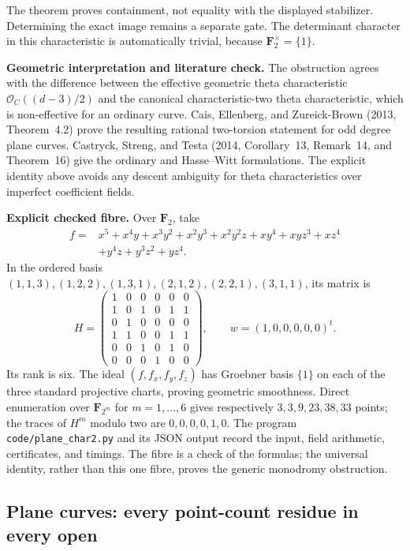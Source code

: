 The theorem proves containment, not equality with the displayed
stabilizer.  Determining the exact image remains a separate gate.
The determinant character in this characteristic is automatically
trivial, because $\mathbf F_2^\times=\{1\}$.

\par\smallskip\noindent\textbf{Geometric interpretation and literature check.}
The obstruction agrees with the difference between the effective
geometric theta characteristic
$\mathcal O_C((d-3)/2)$ and the canonical characteristic-two theta
characteristic, which is non-effective for an ordinary curve.
Cais, Ellenberg, and Zureick-Brown (2013, Theorem~4.2) prove the resulting
rational two-torsion statement for odd degree plane curves.
Castryck, Streng, and Testa (2014, Corollary~13, Remark~14, and
Theorem~16) give the ordinary and Hasse--Witt formulations.
The explicit identity above avoids any descent ambiguity for theta
characteristics over imperfect coefficient fields.

\par\smallskip\noindent\textbf{Explicit checked fibre.}
Over $\mathbf F_2$, take
\begin{align*}
f={}&x^5+x^4y+x^3y^2+x^2y^3+x^2y^2z+xy^4+xyz^3+xz^4\\
 &+y^4z+y^3z^2+yz^4.
\end{align*}
In the ordered basis
$(1,1,3),(1,2,2),(1,3,1),(2,1,2),(2,2,1),(3,1,1)$, its matrix is
\[
H=\begin{pmatrix}
1&0&0&0&0&0\\1&0&1&0&1&1\\0&1&0&0&0&0\\
1&1&0&0&1&1\\0&0&1&0&1&0\\0&0&0&1&0&0
\end{pmatrix},\qquad w=(1,0,0,0,0,0)^t.
\]
Its rank is six.  The ideal $(f,f_x,f_y,f_z)$ has Groebner basis
$\{1\}$ on each of the three standard projective charts, proving
geometric smoothness.  Direct enumeration over
$\mathbf F_{2^m}$ for $m=1,\ldots,6$ gives respectively
$3,3,9,23,38,33$ points; the traces of $H^m$ modulo two are
$0,0,0,0,1,0$.  The program \texttt{code/plane\_char2.py} and its JSON
output record the input, field arithmetic, certificates, and timings.
The fibre is a check of the formulas; the universal identity, rather
than this one fibre, proves the generic monodromy obstruction.

\subsection{Plane curves: every point-count residue in every open}
\label{subsec:plane-residues}


